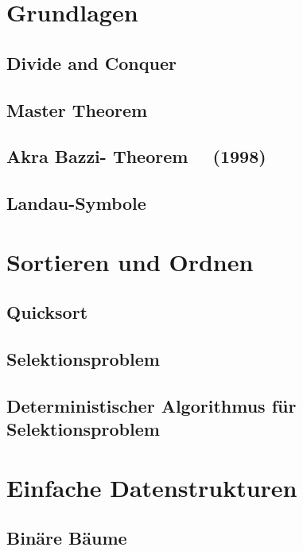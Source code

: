 \chapter{Grundlagen}
	\section{Divide and Conquer}
		
	\section{Master Theorem}
		
	\section{Akra Bazzi- Theorem \, \, (1998)}
		
	\section{Landau-Symbole}
		
\chapter{Sortieren und Ordnen}
	\section{Quicksort}
		
	\section{Selektionsproblem}
		
	\section{Deterministischer Algorithmus für Selektionsproblem}
		
\chapter{Einfache Datenstrukturen}
	\section{Binäre Bäume}
		